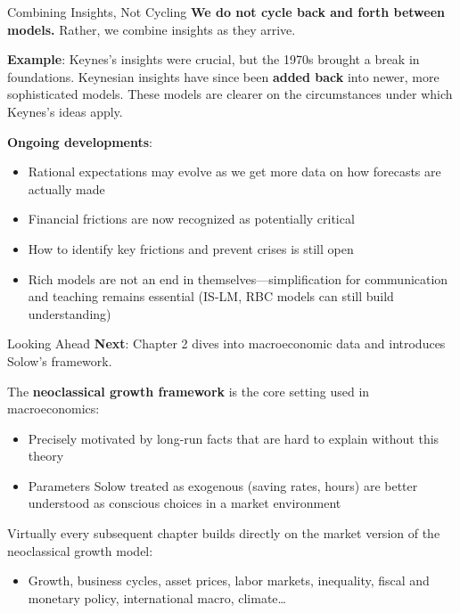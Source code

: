 \documentclass[blue]{beamer}
\begin{document}
\begin{frame}{Combining Insights, Not Cycling}
	\textbf{We do not cycle back and forth between models.} Rather, we combine insights as they arrive.
	

	\textbf{Example}: Keynes's insights were crucial, but the 1970s brought a break in foundations. Keynesian insights have since been \textbf{added back} into newer, more sophisticated models. These models are clearer on the circumstances under which Keynes's ideas apply.
	

	\textbf{Ongoing developments}:
		\vspace{-6pt}
	\begin{itemize}
		\item Rational expectations may evolve as we get more data on how forecasts are actually made
		\item Financial frictions are now recognized as potentially critical
		\item How to identify key frictions and prevent crises is still open
		\item Rich models are not an end in themselves---simplification for communication and teaching remains essential (IS-LM, RBC models can still build understanding)
	\end{itemize}
\end{frame}
\begin{frame}{Looking Ahead}
	\textbf{Next}: Chapter 2 dives into macroeconomic data and introduces Solow's framework.
	

	The \textbf{neoclassical growth framework} is the core setting used in macroeconomics:
	\vspace{-6pt}
	\begin{itemize}
		\item Precisely motivated by long-run facts that are hard to explain without this theory
		\item Parameters Solow treated as exogenous (saving rates, hours) are better understood as conscious choices in a market environment
	\end{itemize}
	

	Virtually every subsequent chapter builds directly on the market version of the neoclassical growth model:
	\vspace{-6pt}
	\begin{itemize}
		\item Growth, business cycles, asset prices, labor markets, inequality, fiscal and monetary policy, international macro, climate\ldots
	\end{itemize}
	

\end{frame}
\end{document}

